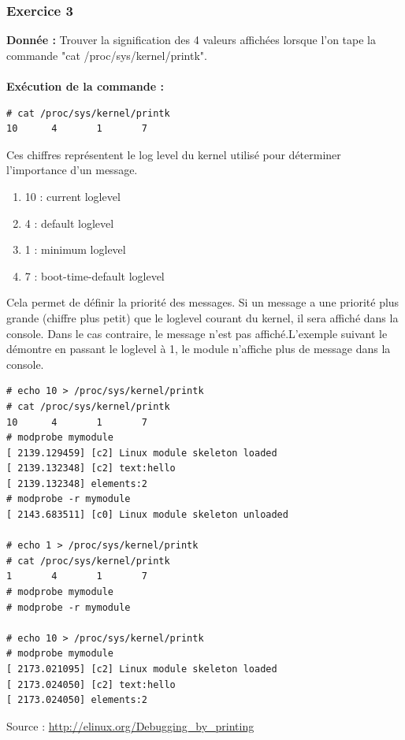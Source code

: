 \subsubsection{Exercice 3}
\textbf{Donnée : } Trouver	la	signification	des	4	valeurs	affichées	lorsque	l’on	tape	la	commande "cat /proc/sys/kernel/printk".\\\\
\textbf{Exécution de la commande : }
\begin{lstlisting}
# cat /proc/sys/kernel/printk                                                   
10      4       1       7 
\end{lstlisting}
Ces chiffres représentent le log level du kernel utilisé pour déterminer l'importance d'un message.
\begin{enumerate}
	\item 10 : current loglevel
	\item 4 : default loglevel
	\item 1 : minimum loglevel
	\item 7 : boot-time-default loglevel
\end{enumerate}
Cela permet de définir la priorité des messages. Si un message a une priorité plus grande (chiffre plus petit) que le loglevel courant du kernel, il sera affiché dans la console. Dans le cas contraire, le message n'est pas affiché.L'exemple suivant le démontre en passant le loglevel à 1, le module n'affiche plus de message dans la console.
\begin{lstlisting}
# echo 10 > /proc/sys/kernel/printk                                             
# cat /proc/sys/kernel/printk                                                   
10      4       1       7                                                       
# modprobe mymodule                                                             
[ 2139.129459] [c2] Linux module skeleton loaded                                
[ 2139.132348] [c2] text:hello                                                  
[ 2139.132348] elements:2                                                       
# modprobe -r mymodule                                                          
[ 2143.683511] [c0] Linux module skeleton unloaded        
                      
# echo 1 > /proc/sys/kernel/printk                                              
# cat /proc/sys/kernel/printk                                                   
1       4       1       7                                                       
# modprobe mymodule                                                             
# modprobe -r mymodule     
                                                     
# echo 10 > /proc/sys/kernel/printk                                             
# modprobe mymodule                                                             
[ 2173.021095] [c2] Linux module skeleton loaded                                
[ 2173.024050] [c2] text:hello                                                  
[ 2173.024050] elements:2    
\end{lstlisting}  
Source : \url{http://elinux.org/Debugging_by_printing}

